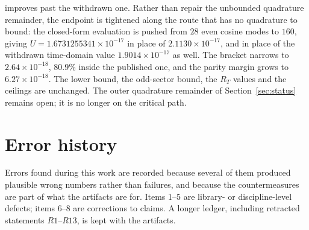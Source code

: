 \documentclass[11pt,a4paper]{article}
\theoremstyle{definition}
\theoremstyle{remark}
\begin{document}
\begin{itemize}
{  improves past the withdrawn one.} Rather than repair the unbounded quadrature
  remainder, the endpoint is tightened along the route that has no quadrature to
  bound: the closed-form evaluation is pushed from $28$ even cosine modes to
  $160$, giving $U = 1.6731255341\times10^{-17}$ in place of
  $2.1130\times10^{-17}$, and in place of the withdrawn time-domain value
  $1.9014\times10^{-17}$ as well. The bracket narrows to $2.64\times10^{-18}$,
  $80.9\%$ inside the published one, and the parity margin grows to
  $6.27\times10^{-18}$. The lower bound, the odd-sector bound, the $R_T$ values
  and the ceilings are unchanged. The outer quadrature remainder of
  Section~\ref{sec:status} remains open; it is no longer on the critical path.
\end{itemize}

\appendix

\section{Error history}
\label{app:errors}

Errors found during this work are recorded because several of them produced
plausible wrong numbers rather than failures, and because the countermeasures
are part of what the artifacts are for. Items 1--5 are library- or
discipline-level defects; items 6--8 are corrections to claims. A longer ledger,
including retracted statements $R1$--$R13$, is kept with the artifacts.
\end{document}
